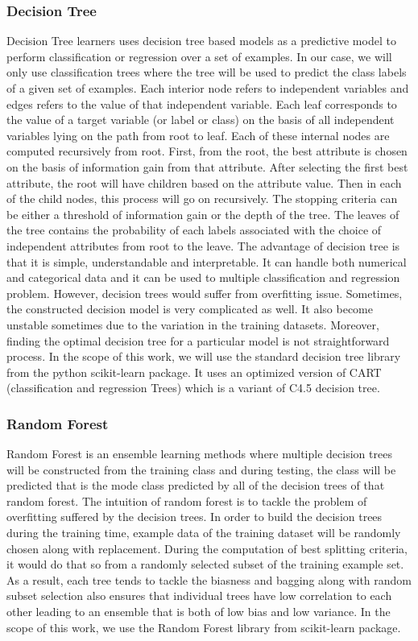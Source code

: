 \documentclass[sigplan]{acmart}\settopmatter{printfolios=true,printccs=false,printacmref=false}
\begin{document}
\subsubsection{Decision Tree}
Decision Tree learners uses decision tree based models as a predictive model to perform classification or regression over a set of examples. In our case, we will only use classification trees where the tree will be used to predict the class labels of a given set of examples. Each interior node refers to independent variables and edges refers to the value of that independent variable. Each leaf corresponds to the value of a target variable (or label or class) on the basis of all independent variables lying on the path from root to leaf. Each of these internal nodes are computed recursively from root. First, from the root, the best attribute is chosen on the basis of information gain from that attribute. After selecting the first best attribute, the root will have children based on the attribute value. Then in each of the child nodes, this process will go on recursively. The stopping criteria can be either a threshold of information gain or the depth of the tree. The leaves of the tree contains the probability of each labels associated with the choice of independent attributes from root to the leave. The advantage of decision tree is that it is simple, understandable and interpretable. It can handle both numerical and categorical data and it can be used to multiple classification and regression problem. However, decision trees would suffer from overfitting issue. Sometimes, the constructed decision model is very complicated as well. It also become unstable sometimes due to the variation in the training datasets. Moreover, finding the optimal decision tree for a particular model is not straightforward process. In the scope of this work, we will use the standard decision tree library from the python scikit-learn package. It uses an optimized version of CART (classification and regression Trees) which is a variant of C4.5 decision tree. 

\subsubsection{Random Forest}
Random Forest is an ensemble learning methods where multiple decision trees will be constructed from the training class and during testing, the class will be predicted that is the mode class predicted by all of the decision trees of that random forest. The intuition of random forest is to tackle the problem of overfitting suffered by the decision trees. In order to build the decision trees during the training time, example data of the training dataset will be randomly chosen along with replacement. During the computation of best splitting criteria, it would do that so from a randomly selected subset of the training example set. As a result, each tree tends to tackle the biasness and bagging along with random subset selection also ensures that individual trees have low correlation to each other leading to an ensemble that is both of low bias and low variance. In the scope of this work, we use the Random Forest library from scikit-learn package.
\end{document}
